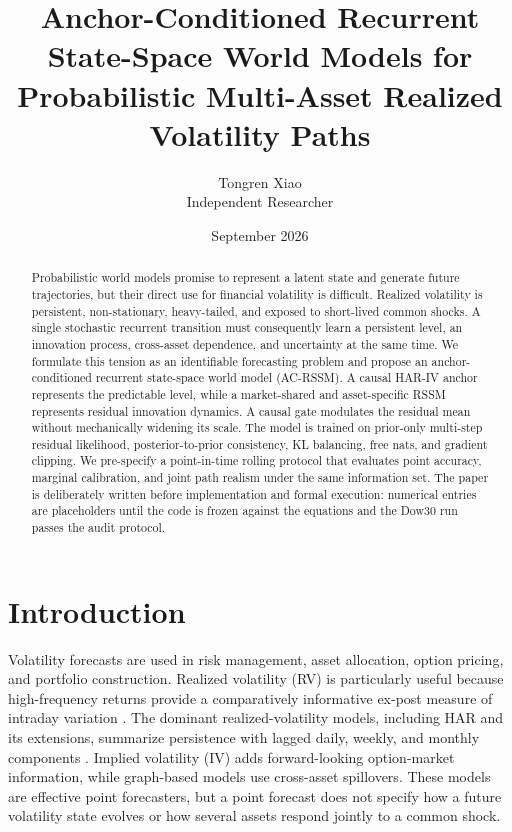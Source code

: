 \documentclass[11pt]{article}
\title{Anchor-Conditioned Recurrent State-Space World Models for\\
Probabilistic Multi-Asset Realized Volatility Paths}
\author{Tongren Xiao\\\small Independent Researcher}
\date{September 2026}
\begin{document}
\maketitle

\begin{abstract}
Probabilistic world models promise to represent a latent state and generate future trajectories, but their direct use for financial volatility is difficult. Realized volatility is persistent, non-stationary, heavy-tailed, and exposed to short-lived common shocks. A single stochastic recurrent transition must consequently learn a persistent level, an innovation process, cross-asset dependence, and uncertainty at the same time. We formulate this tension as an identifiable forecasting problem and propose an anchor-conditioned recurrent state-space world model (AC-RSSM). A causal HAR-IV anchor represents the predictable level, while a market-shared and asset-specific RSSM represents residual innovation dynamics. A causal gate modulates the residual mean without mechanically widening its scale. The model is trained on prior-only multi-step residual likelihood, posterior-to-prior consistency, KL balancing, free nats, and gradient clipping. We pre-specify a point-in-time rolling protocol that evaluates point accuracy, marginal calibration, and joint path realism under the same information set. The paper is deliberately written before implementation and formal execution: numerical entries are placeholders until the code is frozen against the equations and the Dow30 run passes the audit protocol.
\end{abstract}

\section{Introduction}

Volatility forecasts are used in risk management, asset allocation, option pricing, and portfolio construction. Realized volatility (RV) is particularly useful because high-frequency returns provide a comparatively informative ex-post measure of intraday variation \cite{andersen2003}. The dominant realized-volatility models, including HAR and its extensions, summarize persistence with lagged daily, weekly, and monthly components \cite{corsi2009}. Implied volatility (IV) adds forward-looking option-market information, while graph-based models use cross-asset spillovers. These models are effective point forecasters, but a point forecast does not specify how a future volatility state evolves or how several assets respond jointly to a common shock.
\end{document}
